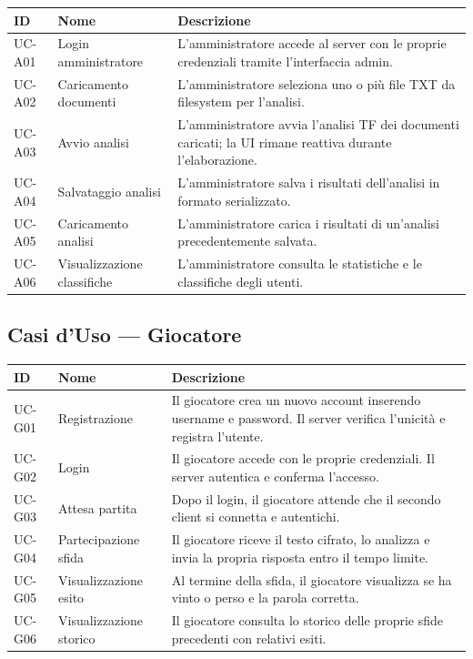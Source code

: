\documentclass[12pt, a4paper]{article}
\begin{document}
\begin{longtable}{|p{1.5cm}|p{3.5cm}|p{8cm}|}
    \hline
    \rowcolor{primaryBlue!20}
    \textbf{ID} & \textbf{Nome} & \textbf{Descrizione} \\
    \hline
    \endhead
    UC-A01 & Login amministratore & L'amministratore accede al server con le proprie credenziali tramite l'interfaccia admin. \\
    \hline
    UC-A02 & Caricamento documenti & L'amministratore seleziona uno o più file TXT da filesystem per l'analisi. \\
    \hline
    UC-A03 & Avvio analisi & L'amministratore avvia l'analisi TF dei documenti caricati; la UI rimane reattiva durante l'elaborazione. \\
    \hline
    UC-A04 & Salvataggio analisi & L'amministratore salva i risultati dell'analisi in formato serializzato. \\
    \hline
    UC-A05 & Caricamento analisi & L'amministratore carica i risultati di un'analisi precedentemente salvata. \\
    \hline
    UC-A06 & Visualizzazione classifiche & L'amministratore consulta le statistiche e le classifiche degli utenti. \\
    \hline
\end{longtable}

\subsection{Casi d'Uso — Giocatore}

\begin{longtable}{|p{1.5cm}|p{3.5cm}|p{8cm}|}
    \hline
    \rowcolor{primaryBlue!20}
    \textbf{ID} & \textbf{Nome} & \textbf{Descrizione} \\
    \hline
    \endhead
    UC-G01 & Registrazione & Il giocatore crea un nuovo account inserendo username e password. Il server verifica l'unicità e registra l'utente. \\
    \hline
    UC-G02 & Login & Il giocatore accede con le proprie credenziali. Il server autentica e conferma l'accesso. \\
    \hline
    UC-G03 & Attesa partita & Dopo il login, il giocatore attende che il secondo client si connetta e autentichi. \\
    \hline
    UC-G04 & Partecipazione sfida & Il giocatore riceve il testo cifrato, lo analizza e invia la propria risposta entro il tempo limite. \\
    \hline
    UC-G05 & Visualizzazione esito & Al termine della sfida, il giocatore visualizza se ha vinto o perso e la parola corretta. \\
    \hline
    UC-G06 & Visualizzazione storico & Il giocatore consulta lo storico delle proprie sfide precedenti con relativi esiti. \\
    \hline
\end{longtable}
\end{document}
